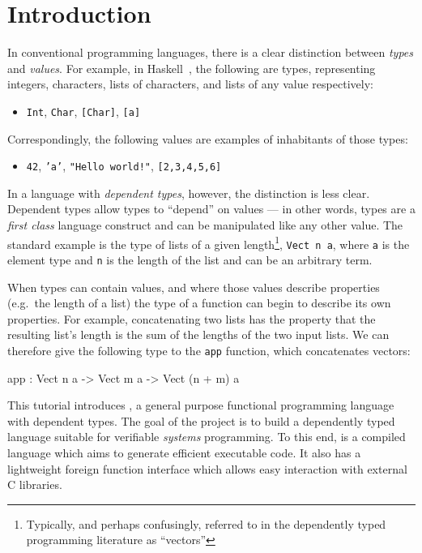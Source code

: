 \section{Introduction}

In conventional programming languages, there is a clear distinction between \emph{types} and \emph{values}.
For example, in Haskell~\cite{haskell-report}, the following are types, representing integers, characters, lists of characters, and lists of any value respectively:

\begin{itemize}
\item \texttt{Int}, \texttt{Char}, \texttt{[Char]}, \texttt{[a]}
\end{itemize}

\noindent
Correspondingly, the following values are examples of inhabitants of those types:

\begin{itemize}
\item \texttt{42}, \texttt{'a'}, \texttt{"Hello world!"}, \texttt{[2,3,4,5,6]}
\end{itemize}

\noindent
In a language with \emph{dependent types}, however, the distinction is less clear.  
Dependent types allow types to ``depend'' on values --- in other words, types are a \emph{first class} language construct and can be manipulated like any other value.
The standard example is the type of lists of a given length\footnote{Typically, and perhaps confusingly, referred to in the dependently typed programming literature as ``vectors''}, \texttt{Vect n a}, where \texttt{a} is the element type and \texttt{n} is the length of the list and can be an arbitrary term.

When types can contain values, and where those values describe properties (e.g.\ the length of a list) the type of a function can begin to describe its own properties.
For example, concatenating two lists has the property that the resulting list's length is the sum of the lengths of the two input lists.
We can therefore give the following type to the \texttt{app} function, which concatenates vectors: 

\begin{code}
app : Vect n a -> Vect m a -> Vect (n + m) a
\end{code}

\noindent
This tutorial introduces \Idris{}, a general purpose functional  programming language with dependent types.
The goal of the \Idris{} project is to build a dependently typed language suitable for verifiable \emph{systems} programming.
To this end, \Idris{} is a compiled language which aims to generate efficient executable code.
It also has a lightweight foreign function interface which allows easy interaction with external C libraries.


